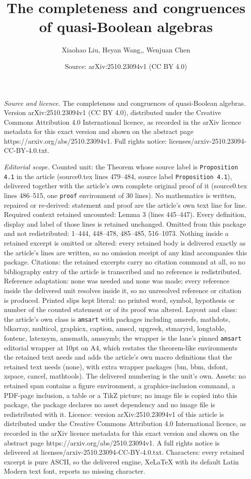 \documentclass[10pt,a4paper]{amsart}
\title[The completeness and congruences of quasi-Boolean algebras]{The completeness and congruences of quasi-Boolean algebras}
\author{Xiaohao Liu, Heyan Wang,, Wenjuan Chen}
\date{Source: arXiv:2510.23094v1 (CC BY 4.0)}
\begin{document}
\maketitle

\noindent\emph{Source and licence.} The completeness and congruences of quasi-Boolean algebras. Version arXiv:2510.23094v1 (CC BY 4.0), distributed under the Creative Commons Attribution 4.0 International licence, as recorded in the arXiv licence metadata for this exact version and shown on the abstract page https://arxiv.org/abs/2510.23094v1. Full rights notice: licenses/arxiv-2510.23094-CC-BY-4.0.txt.\par\smallskip

\noindent\textit{Editorial scope.} Counted unit: the Theorem whose source label is \texttt{Proposition 4.1} in the article (source0.tex lines 479--484, source label \texttt{Proposition 4.1}), delivered together with the article's own complete original proof of it (source0.tex lines 486--515, one \texttt{proof} environment of 30 lines). No mathematics is written, repaired or re-derived: statement and proof are the article's own text line for line. Required context retained uncounted: Lemma 3 (lines 445--447). Every definition, display and label of those lines is retained unchanged. Omitted from this package and not redistributed: 1--444, 448--478, 485--485, 516--1073. Nothing inside a retained excerpt is omitted or altered: every retained body is delivered exactly as the article's lines are written, so no omission receipt of any kind accompanies this package. Citations: the retained excerpts carry no citation command at all, so no bibliography entry of the article is transcribed and no reference is redistributed. Reference adaptation: none was needed and none was made; every reference inside the delivered unit resolves inside it, so no unresolved reference or citation is produced. Printed slips kept literal: no printed word, symbol, hypothesis or number of the counted statement or of its proof was altered. Layout and class: the article's own class is \texttt{amsart} with packages including amsrefs, mathdots, blkarray, multicol, graphicx, caption, amscd, upgreek, stmaryrd, longtable, fontenc, latexsym, amsmath, amssymb; the wrapper is the lane's pinned \texttt{amsart} editorial wrapper at 10pt on A4, which restates the theorem-like environments the retained text needs and adds the article's own macro definitions that the retained text needs (none), with extra wrapper packages (bm, bbm, dsfont, xspace, cancel, mathtools). The delivered numbering is the unit's own. Assets: no retained span contains a figure environment, a graphics-inclusion command, a PDF-page inclusion, a table or a TikZ picture; no image file is copied into this package, the package declares no asset dependency and no image file is redistributed with it. Licence: version arXiv:2510.23094v1 of this article is distributed under the Creative Commons Attribution 4.0 International licence, as recorded in the arXiv licence metadata for this exact version and shown on the abstract page https://arxiv.org/abs/2510.23094v1. A full rights notice is delivered at licenses/arxiv-2510.23094-CC-BY-4.0.txt. Characters: every retained excerpt is pure ASCII, so the delivered engine, XeLaTeX with its default Latin Modern text font, reports no missing character.
\end{document}
